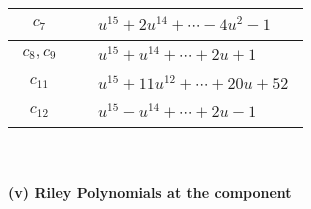 \documentclass[1p]{elsarticle_modified}
\theoremstyle{definition}
\begin{document}
\begin{tabular}{m{50pt}|m{274pt}}
\hline $$\begin{aligned}c_{7}\end{aligned}$$&$\begin{aligned}
&u^{15}+2 u^{14}+\cdots-4 u^2-1
\end{aligned}$\\
\hline $$\begin{aligned}c_{8},c_{9}\end{aligned}$$&$\begin{aligned}
&u^{15}+u^{14}+\cdots+2 u+1
\end{aligned}$\\
\hline $$\begin{aligned}c_{11}\end{aligned}$$&$\begin{aligned}
&u^{15}+11 u^{12}+\cdots+20 u+52
\end{aligned}$\\
\hline $$\begin{aligned}c_{12}\end{aligned}$$&$\begin{aligned}
&u^{15}- u^{14}+\cdots+2 u-1
\end{aligned}$\\
\hline
\end{tabular}\\~\\
\newpage\renewcommand{\arraystretch}{1}
\flushleft \textbf{(v) Riley Polynomials at the component}\newline \\
\end{document}
